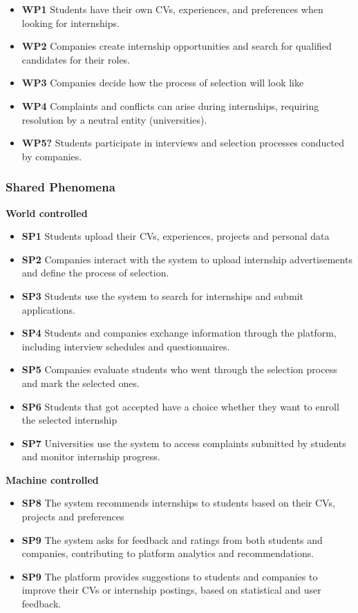 \begin{itemize}
    \item \textbf{WP1} Students have their own CVs, experiences, and preferences when looking for internships.
    \item \textbf{WP2} Companies create internship opportunities and search for qualified candidates for their roles.
    \item \textbf{WP3} Companies decide how the process of selection will look like
    \item \textbf{WP4} Complaints and conflicts can arise during internships, requiring resolution by a neutral entity (universities).
    \item \textbf{WP5?} Students participate in interviews and selection processes conducted by companies.
    
\end{itemize}

\subsubsection{Shared Phenomena}

\textbf{World controlled}
\begin{itemize}
    \item \textbf{SP1} Students upload their CVs, experiences, projects and personal data
    \item \textbf{SP2} Companies interact with the system to upload internship advertisements and define the process of selection.
    \item \textbf{SP3} Students use the system to search for internships and submit applications.
    \item \textbf{SP4} Students and companies exchange information through the platform, including interview schedules and questionnaires.
    \item \textbf{SP5} Companies evaluate students who went through the selection process and mark the selected ones.
    \item \textbf{SP6} Students that got accepted have a choice whether they want to enroll the selected internship
    \item \textbf{SP7} Universities use the system to access complaints submitted by students and monitor internship progress.
    
\end{itemize}
\textbf{Machine controlled}
\begin{itemize}    
    \item \textbf{SP8} The system recommends internships to students based on their CVs, projects and preferences
    \item \textbf{SP9} The system asks for feedback and ratings from both students and companies, contributing to platform analytics and recommendations.
    \item \textbf{SP9} The platform provides suggestions to students and companies to improve their CVs or internship postings, based on statistical and user feedback.
\end{itemize}

